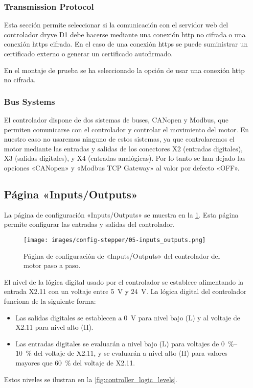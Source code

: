 \documentclass[english,spanish,a4paper,11pt]{article}
\begin{document}
\subsubsection{Transmission Protocol}

Esta sección permite seleccionar si la comunicación con el servidor web del controlador dryve D1 debe hacerse mediante una conexión http no cifrada o una conexión https cifrada. En el caso de una conexión https se puede suministrar un certificado externo o generar un certificado autofirmado.

En el montaje de prueba se ha seleccionado la opción de usar una conexión http no cifrada.


\subsubsection{Bus Systems}

El controlador dispone de dos sistemas de buses, CANopen y Modbus, que permiten comunicarse con el controlador y controlar el movimiento del motor. En nuestro caso no usaremos ninguno de estos sistemas, ya que controlaremos el motor mediante las entradas y salidas de los conectores X2 (entradas digitales), X3 (salidas digitales), y X4 (entradas analógicas). Por lo tanto se han dejado las opciones «CANopen» y «Modbus TCP Gateway» al valor por defecto «OFF».


\subsection{Página «Inputs/Outputs»}
\label{sec:page_input_outputs}

La página de configuración «Inputs/Outputs» se muestra en la \cref{fig:conf_stepper_5}. Esta página permite configurar las entradas y salidas del controlador. 

\begin{figure}[!ht]
    \centering
    \texttt{[image: images/config-stepper/05-inputs\_outputs.png]}
    \caption{Página de configuración de «Inputs/Outputs» del controlador del motor paso a paso.}
    \label{fig:conf_stepper_5}
\end{figure}

El nivel de la lógica digital usado por el controlador se establece alimentando la entrada X2.11 con un voltaje entre \qty{5}{\V} y \qty{24}{\V}. La lógica digital del controlador funciona de la siguiente forma:
\begin{itemize}
    \item Las salidas digitales se establecen a \qty{0}{\V} para nivel bajo (L) y al voltaje de X2.11 para nivel alto (H).

    \item Las entradas digitales se evaluarán a nivel bajo (L) para voltajes de \qtyrange{0}{10}{\percent} del voltaje de X2.11, y se evaluarán a nivel alto (H) para valores mayores que \qty{60}{\percent} del voltaje de X2.11.
\end{itemize}
Estos niveles se ilustran en la \cref{fig:controller_logic_levels}.
\end{document}
